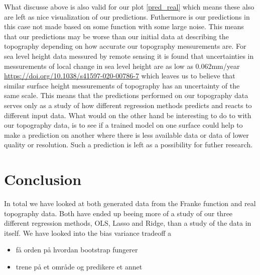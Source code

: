 \documentclass[12pt]{article}
\begin{document}
What discusse above is also valid for our plot \ref{pred_real} which means these also are left as nice visualization of our predictions. Futhermore is our predictions in this case not made based on some function with some large noise. This means that our predictions may be worse than our initial data at describing the topography depending on how accurate our topography messurements are. For sea level height data messured by remote sensing it is found that uncertainties in messurements of local change in sea level height are as low as 0.062mm/year \url{https://doi.org/10.1038/s41597-020-00786-7} which leaves us to believe that similar surface height messurements of topography has an uncertainty of the same scale. This means that the predictions performed on our topography data serves only as a study of how different regression methods predicts and reacts to different input data. What would on the other hand be interesting to do to with our topography data, is to see if a trained model on one surface could help to make a prediction on another where there is less available data or data of lower quality or resolution. Such a prediction is left as a possibility for futher research.

\section{Conclusion}
In total we have looked at both generated data from the Franke function and real topography data. Both have ended up beeing more of a study of our three different regression methods, OLS, Lasso and Ridge, than a study of the data in itself. We have looked into the bias variance tradeoff a

\begin{itemize}
  \item få orden på hvordan bootstrap fungerer
  \item trene på et område og predikere et annet
\end{itemize}
\end{document}
